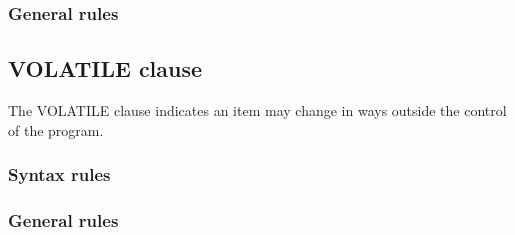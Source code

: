 \subsubsection{General rules}

\subsection{VOLATILE clause}

The VOLATILE clause indicates an item may change in ways outside the control of the program.

\begin{syntax}[\miscextcolour]
\end{syntax}

\subsubsection{Syntax rules}

\subsubsection{General rules}

